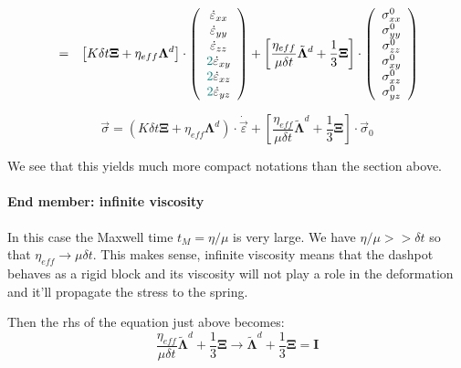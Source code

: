 \begin{eqnarray}
&=& 
\left[
K \delta t {\bm \Xi}
+
\eta_{eff} {\bm \Lambda}^d
\right]
\cdot
\left(
\begin{array}{c}
\dot\varepsilon_{xx}\\ 
\dot\varepsilon_{yy}\\ 
\dot\varepsilon_{zz}\\ 
{\color{teal}2}\dot\varepsilon_{xy} \\ 
{\color{teal}2}\dot\varepsilon_{xz} \\ 
{\color{teal}2}\dot\varepsilon_{yz}
\end{array}
\right) 
+ 
\left[
\frac{\eta_{eff}}{\mu\delta t}
\tilde{\bm\Lambda}^d
+
\frac13 {\bm \Xi}
\right]
\cdot
\left(
\begin{array}{c}
\sigma_{xx}^0\\ 
\sigma_{yy}^0\\ 
\sigma_{zz}^0\\ 
\sigma_{xy}^0 \\
\sigma_{xz}^0 \\
\sigma_{yz}^0
\end{array}
\right) 
\label{simpson3D_b}
\end{eqnarray}







\begin{mdframed}[backgroundcolor=blue!5]
\[
\vec\sigma = 
\left(
K \delta t {\bm \Xi}
+
\eta_{eff} {\bm \Lambda}^d
\right)
\cdot
\dot{\vec{\varepsilon}}
+
\left[
\frac{\eta_{eff}}{\mu\delta t}
\tilde{\bm\Lambda}^d
+
\frac13 {\bm \Xi}
\right]
\cdot
\vec\sigma_0
\]
\end{mdframed}

We see that this yields much more compact notations
than the section above.



\paragraph{End member: infinite viscosity}
In this case the Maxwell time $t_M=\eta/\mu$ is very large.
We have $\eta/\mu >> \delta t$ so that $\eta_{eff} 
\rightarrow \mu \delta t$. This makes sense, infinite 
viscosity means that the dashpot behaves as a rigid block 
and its viscosity will not play a role in the deformation
and it'll propagate the stress to the spring.

Then the rhs of the equation just above becomes: 
\[
\frac{\eta_{eff}}{\mu \delta t} \tilde{\bm\Lambda}^d + 
\frac13 {\bm\Xi} 
\rightarrow
\tilde{\bm\Lambda}^d + 
\frac13 {\bm\Xi} 
=
{\bm I}
\]

